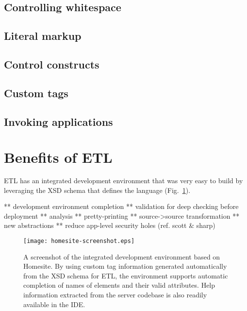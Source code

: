 \documentclass{www2003-submission}
\newcommand{\figref}[1]{Fig.~\ref{fig-#1}}
\begin{document}
\subsection{Controlling whitespace}

\subsection{Literal markup}


\subsection{Control constructs}

\subsection{Custom tags}

\subsection{Invoking applications}


\section{Benefits of ETL}

ETL has an integrated development environment that was very
easy to build by leveraging the XSD schema that defines the language
(\figref{homesite-screenshot}).

** development environment completion
** validation for deep checking before deployment
** analysis 
** pretty-printing 
** source->source transformation 
** new abstractions 
** reduce app-level security holes (ref. scott & sharp)


\begin{figure}[tb]
\begin{centering}
\hspace*{-0.05\linewidth}\texttt{[image: homesite-screenshot.eps]}
\caption{A screenshot of the integrated development environment based
on Homesite.  By using custom tag information generated automatically
from the XSD schema for ETL, the environment supports automatic
completion of names of elements and their valid attributes.  Help
information extracted from the server codebase is also readily
available in the IDE\@.
\label{fig-homesite-screenshot}}
\end{centering}
\end{figure}
\end{document}
